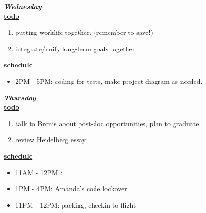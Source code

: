 \underline{\textbf{\textit{Wednesday}}}\\
\underline{\textbf{todo}}\\
\begin{enumerate}
\item putting worklife together, (remember to save!) 
\item integrate/unify long-term goals together 

\end{enumerate}

\underline{\textbf{schedule}}\\
\begin{itemize}
\item 2PM - 5PM: coding for tests, make project diagram as needed.
\end{itemize}

\underline{\textbf{\textit{Thursday}}}\\
\underline{\textbf{todo}}\\
\begin{enumerate}
\item talk to Bronis about post-doc opportunities, plan to graduate 
\item review Heidelberg essay 
\end{enumerate}

\underline{\textbf{schedule}}\\
\begin{itemize}
\item 11AM - 12PM :
\item 1PM - 4PM: Amanda's code lookover
\item 11PM - 12PM: packing, checkin to flight
\end{itemize}

